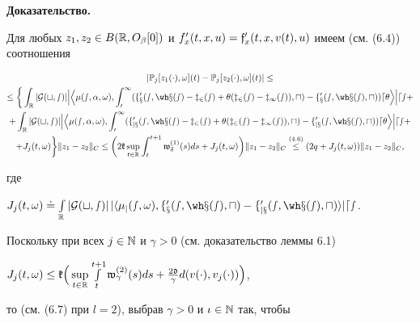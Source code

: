 {\bf Доказательство.} 


Для любых $z_{1}, z_{2}\in B(\R,O_{\beta}[0])$ и $f'_{x}(t,x,u)=


{\gf}'_{x}(t,x,v(t),u)$ имеем (см. (6.4)) соотношения


\begin{gather*}


|\Bbb P_{j}[z_{1}(\cdot),\om](t)-\Bbb P_{j}[z_{2}(\cdot),\om](t)|\le \\


%


\le\bigg\{\int_{\R}|\cal G(t,s)|


\Big|\Big\la\mu(s,\alpha,\om),\int_{0}^{1}


(f'_{x}(s,\wh x(s)-z_{2}(s)+\theta(z_{2}(s)-z_{1}(s)),u)-


f'_{x}(s,\wh x(s),u))d\theta\Big\ra\Big|ds+ \\


%


+\int_{\R}|\cal G(t,s)|\Big|\Big\la\mu(s,\alpha,\om),\int_{0}^{1}


(f'_{jx}(s,\wh x(s)-z_{2}(s)+\theta(z_{2}(s)-z_{1}(s)),u)-


f'_{jx}(s,\wh x(s),u))d\theta\Big\ra\Big|ds+ \\


%


+J_{j}(t,\om)\bigg\}\|z_{1}-z_{2}\|_{C}\le


\bigg(2\frak k\sup\lt_{t\in\R}\int_{t}^{t+1}\frak w_{\dl}^{(1)}(s)ds+


J_{j}(t,\om)\bigg)\|z_{1}-z_{2}\|_{C} \overset{(4.6)}{\le}{}


(2q+J_{j}(t,\om))\|z_{1}-z_{2}\|_{C},


\end{gather*}


где


$J_{j}(t,\om)\doteq\int\lt_{\R}|\cal G(t,s)|\,|\la\mu_{j}(s,\om),


f'_{x}(s,\wh x(s),u)-f'_{jx}(s,\wh x(s),u)\ra|ds$.


Поскольку при всех $j\in\Bbb N$ и $\gamma>0$ (см. доказательство леммы 6.1)


$J_{j}(t,\om)\le\frak k\Big(\sup\lt_{t\in\R}\int\lt_{t}^{t+1}


\frak w_{\gamma}^{(2)}(s)ds


+\frac{2\frak d}{\gamma}d(v(\cdot),v_{j}(\cdot))\Big)$,


то (см. (6.7) при $l=2$), выбрав $\gamma>0$ и $\iota\in\Bbb N$  так, чтобы


